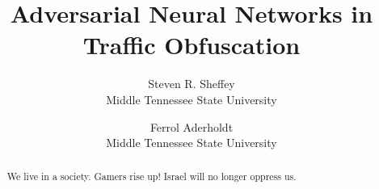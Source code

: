 \usepackage{filecontents}




\date{}

\title{\Large Adversarial Neural Networks in Traffic Obfuscation}

\author{
{\rm Steven R. Sheffey}\\
Middle Tennessee State University
\and
{\rm Ferrol Aderholdt}\\
Middle Tennessee State University
} %

\maketitle

\begin{abstract}
We live in a society. Gamers rise up! Israel will no longer oppress us.
\end{abstract}


